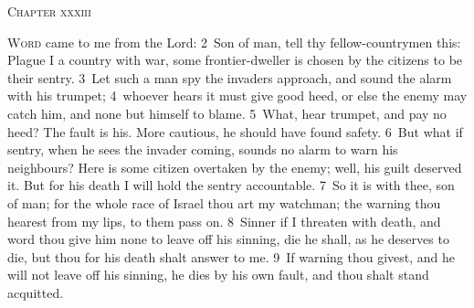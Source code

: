 \documentclass[10pt]{book} %
\begin{document}
\begin{large}\begin{center}\textsc{Chapter xxxiii}\end{center}\end{large}
\lettrine[lines=2]{W}{ord} came to me from the Lord: \textcolor{benred8}{2}~Son of man, tell thy fellow-countrymen this: Plague I a country with war, some frontier-dweller is chosen by the citizens to be their sentry. \textcolor{benred8}{3}~Let such a man spy the invader\textquotesingle s approach, and sound the alarm with his trumpet; \textcolor{benred8}{4}~whoever hears it must give good heed, or else the enemy may catch him, and none but himself to blame. \textcolor{benred8}{5}~What, hear trumpet, and pay no heed? The fault is his. More cautious, he should have found safety. \textcolor{benred8}{6}~But what if sentry, when he sees the invader coming, sounds no alarm to warn his neighbours? Here is some citizen overtaken by the enemy; well, his guilt deserved it. But for his death I will hold the sentry accountable.
\textcolor{benred8}{7}~So it is with thee, son of man; for the whole race of Israel thou art my watchman; the warning thou hearest from my lips, to them pass on. \textcolor{benred8}{8}~Sinner if I threaten with death, and word thou give him none to leave off his sinning, die he shall, as he deserves to die, but thou for his death shalt answer to me. \textcolor{benred8}{9}~If warning thou givest, and he will not leave off his sinning, he dies by his own fault, and thou shalt stand acquitted.
\end{document}
